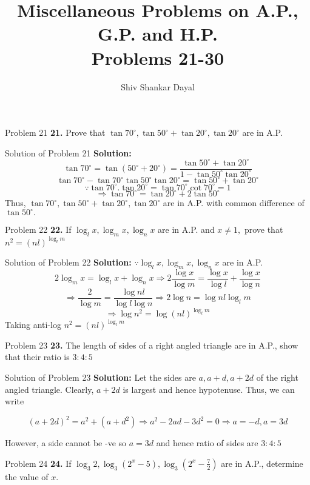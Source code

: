 \documentclass[aspectratio=1610,8pt]{beamer}
\title{Miscellaneous Problems on A.P., G.P. and H.P.\\Problems 21-30}
\author[Shiv Shankar Dayal]{Shiv Shankar Dayal}
\begin{document}
\begin{frame}
  \titlepage
\end{frame}
\begin{frame}{Problem 21}
  \textbf{21.} Prove that $\tan 70^\circ, \tan 50^\circ + \tan 20^\circ, \tan 20^\circ$ are in A.P.
\end{frame}
\begin{frame}{Solution of Problem 21}
  \textbf{Solution:} $$\tan70^\circ = \tan(50^\circ + 20^\circ) = \frac{\tan50^\circ + \tan 20^\circ}{1 - \tan50^\circ\tan20^\circ}$$
  $$\tan70^\circ - \tan70^\circ\tan50^\circ\tan20^\circ = \tan50^\circ + \tan 20^\circ$$
  $$\because \tan70^\circ.\tan20^\circ = \tan70^\circ\cot70^\circ = 1$$
  $$\Rightarrow \tan70^\circ = \tan20^\circ + 2\tan50^\circ$$
  Thus, $\tan 70^\circ, \tan 50^\circ + \tan 20^\circ, \tan 20^\circ$ are in A.P. with common difference of $\tan50^\circ.$
\end{frame}
\begin{frame}{Problem 22}
  \textbf{22.} If $\log_l x, \log_m x, \log_n x$ are in A.P. and $x \neq 1,$ prove that $n^2 = (nl)^{\log_l m}$
\end{frame}
\begin{frame}{Solution of Problem 22}
  \textbf{Solution:} $\because \log_l x, \log_m x, \log_n x$ are in A.P.
  $$2\log_m x = \log_l x + \log_n x \Rightarrow 2\frac{\log x}{\log m} = \frac{\log x}{\log l} + \frac{\log x}{\log n}$$
  $$\Rightarrow \frac{2}{\log m} = \frac{\log nl}{\log l\log n}\Rightarrow 2\log n = \log nl\log_l m$$
  $$\Rightarrow \log n^2 = \log (nl)^{\log_l m}$$
  Taking anti-log $n^2 = (nl)^{\log_l m}$
\end{frame}
\begin{frame}{Problem 23}
  \textbf{23.} The length of sides of a right angled triangle are in A.P., show that their ratio is $3:4:5$
\end{frame}
\begin{frame}{Solution of Problem 23}
  \textbf{Solution:} Let the sides are $a, a + d, a + 2d$ of the right angled triangle. Clearly, $a + 2d$ is largest and hence
  hypotenuse. Thus, we can write

  $$(a + 2d)^2 = a^2 + (a + d^2) \Rightarrow a^2 - 2ad - 3d^2 = 0 \Rightarrow a = -d, a = 3d$$

  However, a side cannot be -ve so $a = 3d$ and hence ratio of sides are $3:4:5$
\end{frame}
\begin{frame}{Problem 24}
  \textbf{24.} If $\log_3 2, \log_3(2^x - 5), \log_3\left(2^x - \frac{7}{2}\right)$ are in A.P., determine the value of $x.$
\end{frame}
\end{document}
